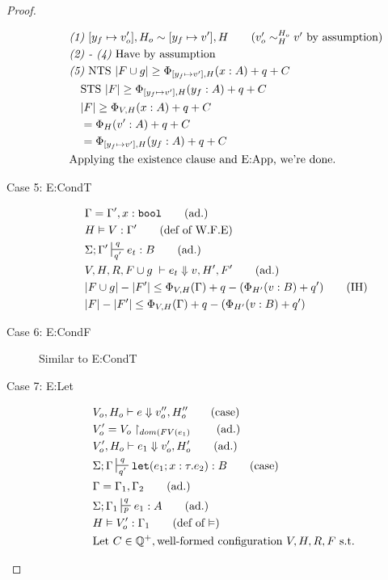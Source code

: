\documentclass{easychair}
\newcommand{\irl}[1]{\mathtt{#1}}
\newcommand{\veq}[4]{#3 \sim^{#1}_{#2} #4}
\theoremstyle{definition}
\begin{document}
\begin{proof}
\begin{description}
\begin{align*}
			&\emph{(1) }[y_f \mapsto v_o'],H_o \sim [y_f \mapsto v'],H 
				\tag{$\veq{H_o}{H}{v_o'}{v'}$ by assumption}\\
			&\emph{(2) - (4) } \text{Have by assumption }\\
			&\emph{(5) } \text{NTS } |F \cup g| \ge \Phi_{[y_f \mapsto v'],H}(x : A) + q + C\\
			&\quad \text{STS } |F| \ge  \Phi_{[y_f \mapsto v'],H}(y_f : A) + q + C\\
			&\quad |F| \ge \Phi_{V,H}(x : A) + q + C\\
			&\quad = \Phi_H(v' : A) + q + C\\
			&\quad = \Phi_{[y_f \mapsto v'],H}(y_f : A) + q + C\\
			&\text{Applying the existence clause and E:App, we're done. }
		\end{align*}
  \item[Case 5: E:CondT]
  \begin{align*}
  &\Gamma = \Gamma', x : \irl{bool} \tag{ad.}\\
  &H \vDash V : \Gamma' \tag{def of W.F.E}\\
  &\Sigma; \Gamma' \sststile{q'}{q} e_t : B \tag{ad.}\\
  &V,H,R,F \cup g\; \vdash e_t \Downarrow v, H',F' \tag{ad.}\\
  &|F \cup g| - |F'| \le \Phi_{V,H}(\Gamma) +q - (\Phi_{H'}(v:B) + q') \tag{IH}\\
  &|F| - |F'| \le \Phi_{V,H}(\Gamma) +q - (\Phi_{H'}(v:B) + q') \\
  \end{align*}
  \item[Case 6: E:CondF] 
  Similar to E:CondT
  \item[Case 7: E:Let]
  \begin{align*}
  &V_o,H_o \vdash e \Downarrow v_o'',H_o'' \tag{case}\\
		&V_o' = V_o\restriction_{dom(FV(e_1)} \tag{ad.}\\
  &V_o',H_o \vdash e_1 \Downarrow v_o',H_o' \tag{ad.}\\
		&\Sigma; \Gamma \sststile{q'}{q} \irl{let}(e_1; x : \tau.e_2) : B \tag{case}\\
		&\Gamma = \Gamma_1,\Gamma_2 \tag{ad.}\\
  &\Sigma; \Gamma_1 \sststile{p}{q} e_1 : A \tag{ad.}\\
  &H \vDash V_o' : \Gamma_1 \tag{def of $\vDash$}\\
		&\text{Let } C \in \mathbb{Q}^+, \text{well-formed configuration } V,H,R,F \text{ s.t. }

\end{align*}
\end{description}
\end{proof}
\end{document}
